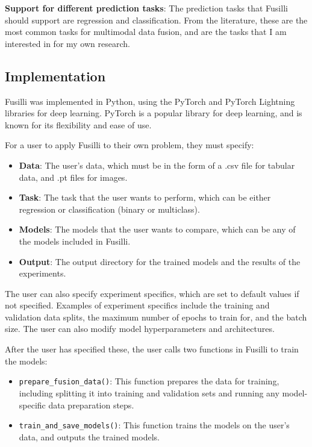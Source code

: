 \vspace{0.3cm}

\noindent\textbf{Support for different prediction tasks}: The prediction tasks that Fusilli should support are regression and classification.
From the literature, these are the most common tasks for multimodal data fusion, and are the tasks that I am interested in for my own research.


\subsection{Implementation}

Fusilli was implemented in Python, using the PyTorch and PyTorch Lightning libraries for deep learning.
PyTorch is a popular library for deep learning, and is known for its flexibility and ease of use.

\noindent For a user to apply Fusilli to their own problem, they must specify:
\begin{itemize}
  \setlength\itemsep{-0.5em}
    \item \textbf{Data}: The user's data, which must be in the form of a .csv file for tabular data, and .pt files for images.
    \item \textbf{Task}: The task that the user wants to perform, which can be either regression or classification (binary or multiclass).
    \item \textbf{Models}: The models that the user wants to compare, which can be any of the models included in Fusilli.
    \item \textbf{Output}: The output directory for the trained models and the results of the experiments.
\end{itemize}

\noindent The user can also specify experiment specifics, which are set to default values if not specified.
Examples of experiment specifics include the training and validation data splits, the maximum number of epochs to train for, and the batch size.
The user can also modify model hyperparameters and architectures.

After the user has specified these, the user calls two functions in Fusilli to train the models:
\begin{itemize}
\setlength\itemsep{-0.5em}
    \item \texttt{prepare\_fusion\_data()}: This function prepares the data for training, including splitting it into training and validation sets and running any model-specific data preparation steps.
    \item \texttt{train\_and\_save\_models()}: This function trains the models on the user's data, and outputs the trained models.
\end{itemize}

